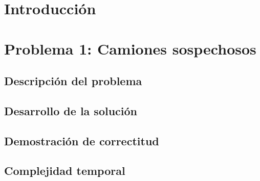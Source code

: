 \documentclass[a4paper, 10pt, twoside]{article}
\begin{document}
\newpage



\tableofcontents

\newpage



\section{Introducción}


\newpage



\section{Problema 1: Camiones sospechosos}

\subsection{Descripción del problema}


\subsection{Desarrollo de la solución}


\subsection{Demostración de correctitud}


\subsection{Complejidad temporal}

\end{document}
